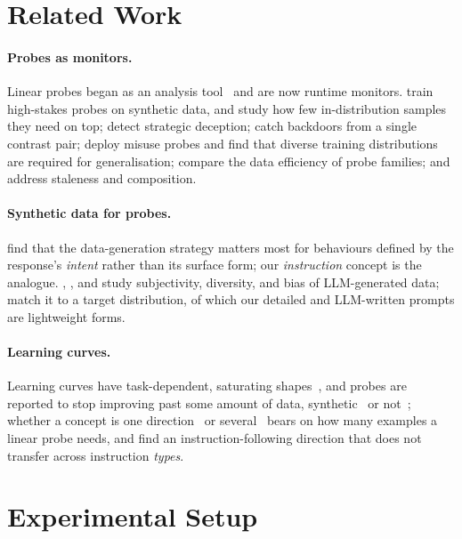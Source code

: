 \documentclass{article} %
\newcommand{\instr}{\emph{instruction}}
\begin{document}
\section{Related Work}
\label{sec:related}
\paragraph{Probes as monitors.}
Linear probes began as an analysis tool~\citep{alain2017understanding,belinkov2022probing,hewitt2019control} and are now runtime monitors. \citet{mckenzie2025highstakes} train high-stakes probes on synthetic data, and study how few in-distribution samples they need on top; \citet{goldowskydill2025deception} detect strategic deception; \citet{macdiarmid2024sleeper} catch backdoors from a single contrast pair; \citet{kramar2026production} deploy misuse probes and find that diverse training distributions are required for generalisation; \citet{tillman2025taskspecific} compare the data efficiency of probe families; \citet{duan2026staleness} and \citet{rozenfeld2026gavel} address staleness and composition.
\paragraph{Synthetic data for probes.}
\citet{kirch2026offpolicy} find that the data-generation strategy matters most for behaviours defined by the response's \emph{intent} rather than its surface form; our \instr{} concept is the analogue. \citet{li2023synthetic}, \citet{yu2023attrprompt}, and \citet{ye2022zerogen} study subjectivity, diversity, and bias of LLM-generated data; \citet{ren2025distribution} match it to a target distribution, of which our detailed and LLM-written prompts are lightweight forms.

\paragraph{Learning curves.}
Learning curves have task-dependent, saturating shapes~\citep{hestness2017deep,viering2023shape}, and probes are reported to stop improving past some amount of data, synthetic~\citep{mckenzie2025highstakes} or not~\citep{liu2024truthfulness}; whether a concept is one direction~\citep{park2024linear} or several~\citep{engels2025notall} bears on how many examples a linear probe needs, and \citet{heo2025instructions} find an instruction-following direction that does not transfer across instruction \emph{types}.

\section{Experimental Setup}
\label{sec:setup}
\end{document}
